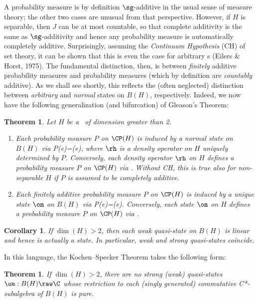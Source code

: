 \documentclass[12pt]{article}
\newtheorem{Theorem}[Definition]{Theorem}
\newtheorem{Corollary}[Definition]{Corollary}
\begin{document}
A probability measure is by definition $\sg$-additive in the usual sense of measure theory; the other two cases are unusual from that perspective. However, if $H$ is separable, then $J$ can be at most countable, so that complete
additivity is the same as $\sg$-additivity and hence any probability measure is automatically completely additive.
Surprisingly, assuming the \emph{Continuum Hypothesis} (CH) of set theory, it can be shown that this is even the case for arbitrary \Hs s  (Eilers \& Horst, 1975). The fundamental distinction, then, is between 
\emph{finitely} additive probability measures and probability measures (which by definition are \emph{countably} additive). As we shall see shortly, this reflects the (often neglected) distinction between \emph{arbitrary} and \emph{normal} states on $B(H)$, respectively. Indeed, we now have the following generalization (and bifurcation) of Gleason's Theorem:
\begin{Theorem}\label{Gleason2}
Let $H$ be a  \Hs\ of dimension greater than 2.
\begin{enumerate}
\item Each probability measure $P$ 
on $\CP(H)$ is induced by a   normal state  on $B(H)$ via
\beq
P(e)=\Tr(\rh e), \label{Peometrrhoe}
\eeq where $\rh$ is a  density operator on $H$ uniquely determined by $P$. 
 Conversely, each density operator $\rh$ on $H$ defines a probability measure $P$ 
on $\CP(H)$ via . 
Without CH, this is true  also for non-separable $H$ if $P$ is assumed to be completely additive. 
\item  Each finitely additive probability measure $P$ 
on $\CP(H)$ is induced by a  unique  state  $\om$ on $B(H)$ via
\beq
P(e)=\om(e).\label{Peometrrhoec}
\eeq 
 Conversely, each state $\om$ on $H$ defines a probability measure $P$ 
on $\CP(H)$ via .
\end{enumerate}
\end{Theorem}
\begin{Corollary} If $\dim(H)>2$, then
 each weak quasi-state on $B(H)$  is linear and hence is actually a state. In particular, 
 weak and strong quasi-states coincide.
\end{Corollary}
In this language, the Kochen--Specker Theorem takes the following form:
 \begin{Theorem}\label{KSv1}
 If $\dim(H)>2$,  there are no strong (weak) quasi-states $\om:B(H)\raw\C$ whose restriction to each (singly generated) 
 commutative C*-subalgebra of  $B(H)$ is pure.
 \end{Theorem}
\end{document}
